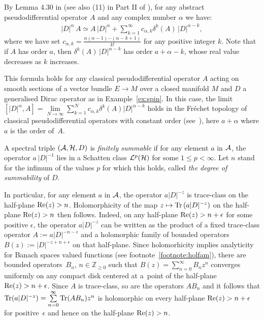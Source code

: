 \documentclass[pdftex]{sigma}
\def \Z {\mathbb Z}
\def \e {{\epsilon}}
\numberwithin{equation}{section}
\begin{document}
By Lemma
4.30 in \cite{Hig} (see also (11) in Part II of \cite{CoMo}), for any abstract
pseudodif\/ferential operator $A$ and any complex number $\alpha$  we have:
 \begin{gather} \label{eq:commDalpha} \vert D\vert^\alpha\,  A\simeq    A\,
 \vert D\vert^\alpha+  \sum_{k=1}^\infty c_{\alpha,k}
\delta^k(A) \, \vert D\vert^{\alpha -k},
\end{gather}
 where we have set $c_{ \alpha, k}=
 \frac{\alpha(\alpha-1)\cdots (\alpha-k+1)}{k!}$ for any positive integer $k$. Note that if $A$ has order
$a$,
 then  $\delta^k(A)\, \vert D\vert^{\alpha-k}$ has order $a+\alpha-k$,   whose
 real value  decreases as $k$ increases.
\begin{example}
This formula holds  for any classical pseudodif\/ferential
operator $A$ acting on smooth sections of a vector bundle $E\to M$ over a
closed manifold $M$  and $D$ a generalised Dirac operator as in Example~\ref{ex:spin}. In this case,   the
limit $[\vert D\vert^\alpha, A]= \lim\limits_{N\to \infty}  \sum\limits_{k=1}^N c_{\alpha,k}
\delta^k(A)   \vert D\vert^{\alpha -k}$  holds in the Fr\'echet topology  of
classical pseudodif\/ferential operators with constant order (see~\cite{KV}),
 here $a+\alpha$ where $a$ is the order of~$A$.
\end{example}

\begin{definition} A  spectral triple $\left({\cal A}, {\cal H}, D\right)$ is   {\it
    finitely summable}   if  for any element $ a$ in
${\cal A}$, the operator $a\, \vert D\vert^{-1}$ lies in  a  Schatten class ${\cal
  L}^p({\cal H})$ for some $1\leq p<\infty$. Let $n$ stand for the inf\/imum of
the values  $p$ for which this holds, called {\it the degree of summability}
of $D$.
\end{definition}

\begin{remark}  In particular, for any element $ a$ in
${\cal A}$, the operator $a
    \vert D\vert^{-z}$ is trace-class  on the half-plane ${\rm
    Re}(z)>n $. Holomorphicity of the map $z\mapsto {\rm Tr}\left(a
    \vert D\vert^{-z}\right)$ on the half-plane ${\rm
    Re}(z)>n $ then follows. Indeed,  on any half-plane  ${\rm    Re}(z)>n+\e$ for some positive $\e$, the operator   $a   \vert D\vert^{-z}$  can be written  as  the product of a f\/ixed trace-class operator $A:= a \vert D\vert^{-n-\e}$ and a holomorphic family of bounded operators $B(z):=\vert D\vert^{-z+n+\e}$  on that
half-plane.   Since  holomorhicity implies analyticity for  Banach spaces valued functions (see  footnote~\ref{footnote:holfam}), there are bounded operators~$B_n$, $n\in \Z_{\geq 0}$ such that
$B(z)=\sum\limits_{n=0}^\infty B_n z^n$ converges uniformly on any compact disk centered at a~point of the half-plane  ${\rm
    Re}(z)>n+\e$.  Since $A$ is trace-class, so are the operators $AB_n$ and it  follows that ${\rm Tr}(a   \vert D\vert^{-z})= \sum\limits_{n=0}^\infty{\rm Tr}( A  B_n)z^n$ is holomorphic on every half-plane  ${\rm
    Re}(z)>n+\e$ for  positive~$\e$
 and hence on the half-plane  ${\rm
    Re}(z)>n$.
\end{remark}
\end{document}
